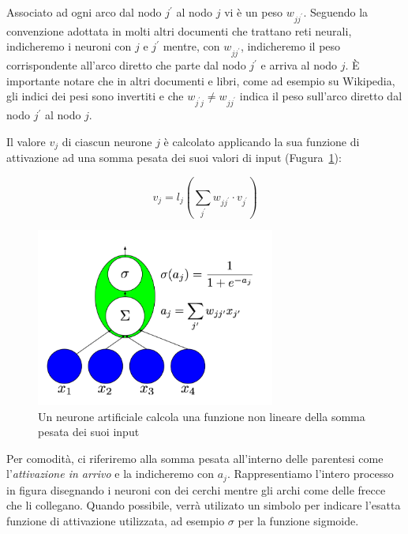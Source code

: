 Associato ad ogni arco dal nodo $j^{'}$ al nodo $j$ vi \`e un peso $w_{jj^{'}}$.
Seguendo la convenzione adottata in molti altri documenti che trattano reti neurali,
indicheremo i neuroni con $j$ e $j^{'}$ mentre, con $w_{jj^{'}}$, indicheremo il
peso corrispondente all'arco diretto che parte dal nodo $j^{'}$ e arriva al nodo $j$.
\`E importante notare che in altri documenti e libri, come ad esempio su Wikipedia,
gli indici dei pesi sono invertiti e che $w_{j^{'}j} \neq w_{jj^{'}}$ indica il
peso sull'arco diretto dal nodo $j^{'}$ al nodo $j$.

Il valore $v_j$ di ciascun neurone $j$ \`e calcolato applicando la sua funzione
di attivazione ad una somma pesata dei suoi valori di input
(Fugura~\ref{fig:artificialNeuron}): %

\begin{equation} %
  v_j = l_j\left( \sum_{j^{'}} w_{jj^{'}} \cdot v_{j^{'}} \right)
\end{equation}

\begin{figure}[tp]
  \centering
  \begin{center}
    \includegraphics[width=0.7\textwidth]{./images/artificialNeuron.png}
  \end{center}
  \caption{Un neurone artificiale calcola una funzione non lineare della somma
  pesata dei suoi input}
  \label{fig:artificialNeuron}
\end{figure}

Per comodit\`a, ci riferiremo alla somma pesata all'interno delle parentesi come
l'\emph{attivazione in arrivo} e la indicheremo con $a_j$. Rappresentiamo
l'intero processo in figura disegnando i neuroni con dei cerchi mentre gli archi
come delle frecce che li collegano. Quando possibile, verr\`a utilizato un simbolo
per indicare l'esatta funzione di attivazione utilizzata, ad esempio $\sigma$ per
la funzione sigmoide.

